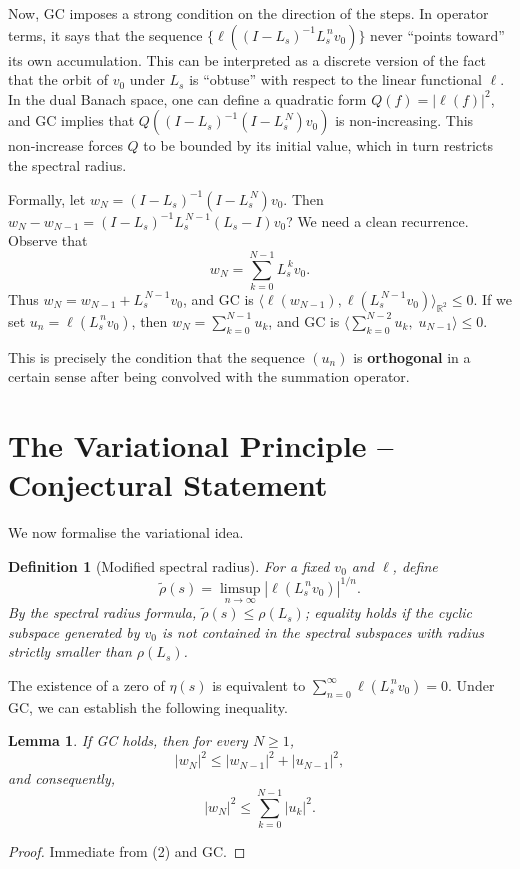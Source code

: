 \documentclass[11pt,a4paper]{article}
\newtheorem{lemma}[theorem]{Lemma}
\newtheorem{definition}[theorem]{Definition}
\newcommand{\R}{\mathbb{R}}
\begin{document}
Now, GC imposes a strong condition on the direction of the steps.  In operator terms, it says that the sequence $\{ \ell( (I - L_s)^{-1} L_s^{\,n} v_0 ) \}$ never ``points toward'' its own accumulation.  This can be interpreted as a discrete version of the fact that the orbit of $v_0$ under $L_s$ is ``obtuse'' with respect to the linear functional $\ell$.  In the dual Banach space, one can define a quadratic form $Q(f) = |\ell(f)|^2$, and GC implies that $Q( (I - L_s)^{-1}(I - L_s^{\,N}) v_0 )$ is non‑increasing.  This non‑increase forces $Q$ to be bounded by its initial value, which in turn restricts the spectral radius.

Formally, let $w_N = (I - L_s)^{-1}(I - L_s^{\,N}) v_0$.  Then $w_{N} - w_{N-1} = (I - L_s)^{-1} L_s^{\,N-1} (L_s - I) v_0$?  We need a clean recurrence.  Observe that
\[
w_{N} = \sum_{k=0}^{N-1} L_s^{\,k} v_0.
\]
Thus $w_{N} = w_{N-1} + L_s^{\,N-1} v_0$, and GC is $\langle \ell(w_{N-1}), \ell(L_s^{\,N-1} v_0) \rangle_{\R^2} \le 0$.  If we set $u_n = \ell(L_s^{\,n} v_0)$, then $w_N = \sum_{k=0}^{N-1} u_k$, and GC is $\langle \sum_{k=0}^{N-2} u_k,\; u_{N-1} \rangle \le 0$.

This is precisely the condition that the sequence $(u_n)$ is \textbf{orthogonal} in a certain sense after being convolved with the summation operator.

\section{The Variational Principle -- Conjectural Statement}
We now formalise the variational idea.

\begin{definition}[Modified spectral radius]
For a fixed $v_0$ and $\ell$, define
\[
\tilde{\rho}(s) = \limsup_{n\to\infty} |\ell( L_s^{\,n} v_0 )|^{1/n}.
\]
By the spectral radius formula, $\tilde{\rho}(s) \le \rho(L_s)$; equality holds if the cyclic subspace generated by $v_0$ is not contained in the spectral subspaces with radius strictly smaller than $\rho(L_s)$.
\end{definition}

The existence of a zero of $\eta(s)$ is equivalent to $\sum_{n=0}^{\infty} \ell(L_s^{\,n} v_0) = 0$.  Under GC, we can establish the following inequality.

\begin{lemma}\label{lem:energy}
If GC holds, then for every $N \ge 1$,
\[
|w_N|^2 \le |w_{N-1}|^2 + |u_{N-1}|^2,
\]
and consequently,
\[
|w_N|^2 \le \sum_{k=0}^{N-1} |u_k|^2.
\tag{4}
\]
\end{lemma}
\begin{proof}
Immediate from (2) and GC.
\end{proof}
\end{document}
